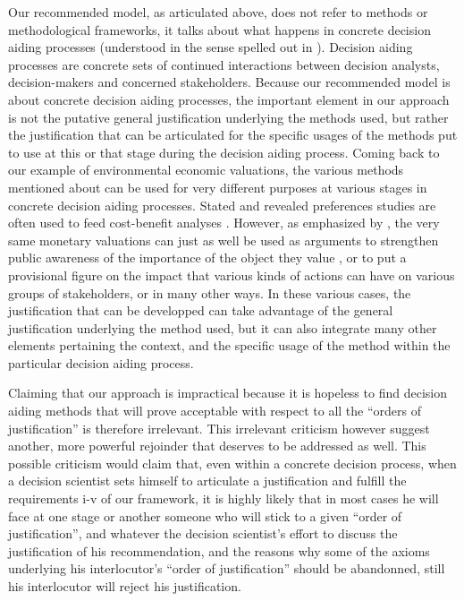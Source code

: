\documentclass[preprint, french, english, 11pt, authoryear]{elsarticle}%
\begin{document}
Our recommended model, as articulated above, does not refer to methods or methodological frameworks, it talks about what happens in concrete decision aiding processes (understood in the sense spelled out in \citep{tsoukias_concept_2007}). Decision aiding processes are concrete sets of continued interactions between decision analysts, decision-makers and concerned stakeholders. Because our recommended model is about concrete decision aiding processes, the important element in our approach is not the putative general justification underlying the methods used, but rather the justification that can be articulated for the specific usages of the methods put to use at this or that stage during the decision aiding process. Coming back to our example of environmental economic valuations, the various methods mentioned about can be used for very different purposes at various stages in concrete decision aiding processes. Stated and revealed preferences studies are often used to feed cost-benefit analyses \citep{layard_cost-benefit_1994}. However, as emphasized by \citep{meinard_ethical_2016}, the very same monetary valuations can just as well be used as arguments to strengthen public awareness of the importance of the object they value \citep{salles_valuing_2011}, or to put a provisional figure on the impact that various kinds of actions can have on various groups of stakeholders, or in many other ways. In these various cases, the justification that can be developped can take advantage of the general justification underlying the method used, but it can also integrate many other elements pertaining the context, and the specific usage of the method within the particular decision aiding process.

Claiming that our approach is impractical because it is hopeless to find decision aiding methods that will prove acceptable with respect to all the ``orders of justification'' is therefore irrelevant. This irrelevant criticism however suggest another, more powerful rejoinder that deserves to be addressed as well. This possible criticism would claim that, even within a concrete decision process, when a decision scientist sets himself to articulate a justification and fulfill the requirements i-v of our framework, it is highly likely that in most cases he will face at one stage or another someone who will stick to a given ``order of justification'', and whatever the decision scientist's effort to discuss the justification of his recommendation, and the reasons why some of the axioms underlying his interlocutor's ``order of justification'' should be abandonned, still his interlocutor will reject his justification.
\end{document}
